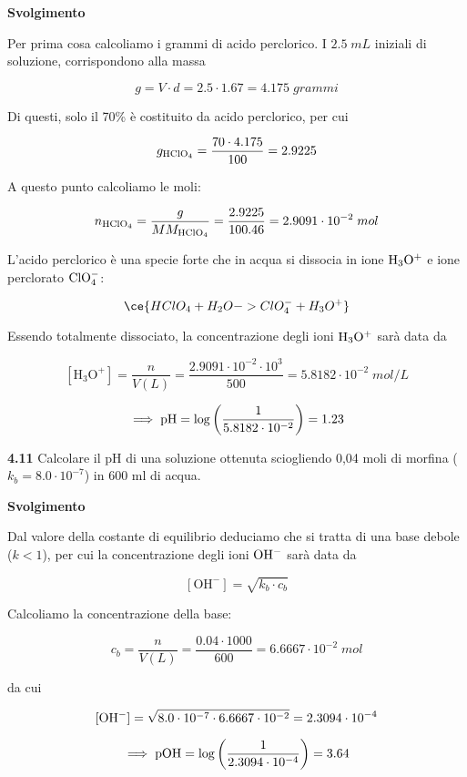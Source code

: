 \vspace{0.2cm}\large\textbf{Svolgimento}\normalsize

\vspace{0.2cm}Per prima cosa calcoliamo i grammi di acido perclorico. I $2.5\;mL$ iniziali di soluzione, corrispondono alla massa

$$g=V \cdot d=2.5 \cdot 1.67=4.175\;grammi$$

Di questi, solo il 70\% è costituito da acido perclorico, per cui

$$g_{\rm HClO_4}=\frac{70 \cdot 4.175}{100}=2.9225$$

A questo punto calcoliamo le moli:

$$n_{\rm HClO_4}
=\frac{g}{MM_{\rm HClO_4}}
=\frac{2.9225}{100.46}=2.9091 \cdot 10^{-2}\;mol$$

L'acido perclorico è una specie forte che in acqua si dissocia in ione $\rm H_3O^+$ e ione perclorato $\rm ClO_4^-$:

$$\ce{HClO_4 + H_2O -> ClO_4^- + H_3O^+}$$

Essendo totalmente dissociato, la concentrazione degli ioni $\rm H_3O^+$ sarà data da

$$[\text{H}_3\text{O}^+]=\frac{n}{V(L)}=\frac{2.9091 \cdot 10^{-2} \cdot 10^{3}}{500}=5.8182 \cdot 10^{-2}\;mol/L$$

$$\implies \rm pH=\log{\left( \frac{1}{5.8182 \cdot 10^{-2}} \right)}=1.23$$

\vspace{0.2cm}\textbf{4.11} Calcolare il pH di una soluzione ottenuta sciogliendo 0,04 moli di morfina ($k_b = 8.0 \cdot 10^{-7}$) in 600 ml di acqua.

\vspace{0.2cm}\large\textbf{Svolgimento}\normalsize

\vspace{0.2cm}Dal valore della costante di equilibrio deduciamo che si tratta di una base debole ($k<1$), per cui la concentrazione degli ioni $\rm OH^-$ sarà data da

$$[\text{OH}^-]=\sqrt{k_b \cdot c_b}$$

Calcoliamo la concentrazione della base:

$$c_b=\frac{n}{V(L)}=
\frac{0.04 \cdot 1000}{600}=6.6667 \cdot 10^{-2}\;mol$$

da cui

$$\rm [OH^-]=\sqrt{8.0 \cdot 10^{-7} \cdot 6.6667 \cdot 10^{-2}}
=2.3094 \cdot 10^{-4}$$

$$\implies \rm pOH=\log{\left(\frac{1}{2.3094 \cdot 10^{-4}}\right)}
=3.64$$

